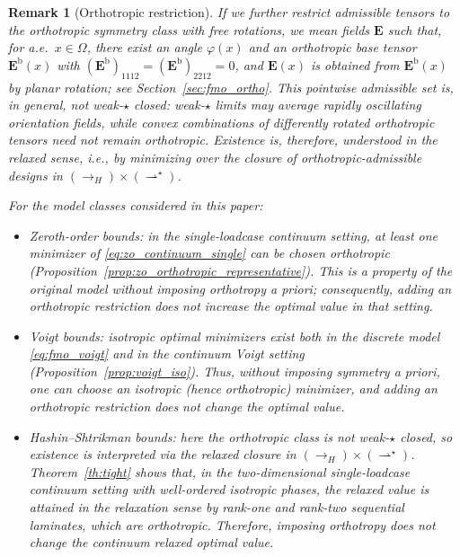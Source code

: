 \documentclass[preprint,3p]{elsarticle}
\newcommand{\tens}[1]{\bm{\mathit{#1}}}             %
\newcommand{\tensf}[1]{\bm{\mathbf{#1}}}            %
\newtheorem{remark}{Remark}[section]
\begin{document}
\begin{remark}[Orthotropic restriction]
If we further restrict admissible tensors to the orthotropic symmetry class with free rotations, we mean fields $\tensf E$ such that, for a.e.\ $\tens x\in\Omega$, there exist an angle $\varphi(\tens x)$ and an orthotropic base tensor $\tensf E^{\mathrm b}(\tens x)$ with $(\tensf E^{\mathrm b})_{1112}=(\tensf E^{\mathrm b})_{2212}=0$, and $\tensf E(\tens x)$ is obtained from $\tensf E^{\mathrm b}(\tens x)$ by planar rotation; see Section~\ref{sec:fmo_ortho}. This pointwise admissible set is, in general, not weak-$\star$ closed: weak-$\star$ limits may average rapidly oscillating orientation fields, while convex combinations of differently rotated orthotropic tensors need not remain orthotropic. Existence is, therefore, understood in the relaxed sense, i.e., by minimizing over the closure of orthotropic-admissible designs in $(\to_H)\times(\rightharpoonup^\star)$.

For the model classes considered in this paper:
\begin{itemize}
    \item Zeroth-order bounds: in the single-loadcase continuum setting, at least one minimizer of \eqref{eq:zo_continuum_single} can be chosen orthotropic (Proposition~\ref{prop:zo_orthotropic_representative}). This is a property of the original model without imposing orthotropy a priori; consequently, adding an orthotropic restriction does not increase the optimal value in that setting.
    \item Voigt bounds: isotropic optimal minimizers exist both in the discrete model \eqref{eq:fmo_voigt} and in the continuum Voigt setting (Proposition~\ref{prop:voigt_iso}). Thus, without imposing symmetry a priori, one can choose an isotropic (hence orthotropic) minimizer, and adding an orthotropic restriction does not change the optimal value.
    \item Hashin--Shtrikman bounds: here the orthotropic class is not weak-$\star$ closed, so existence is interpreted via the relaxed closure in $(\to_H)\times(\rightharpoonup^\star)$. Theorem~\ref{th:tight} shows that, in the two-dimensional single-loadcase continuum setting with well-ordered isotropic phases, the relaxed value is attained in the relaxation sense by rank-one and rank-two sequential laminates, which are orthotropic. Therefore, imposing orthotropy does not change the continuum relaxed optimal value.
\end{itemize}
\end{remark}
\end{document}
